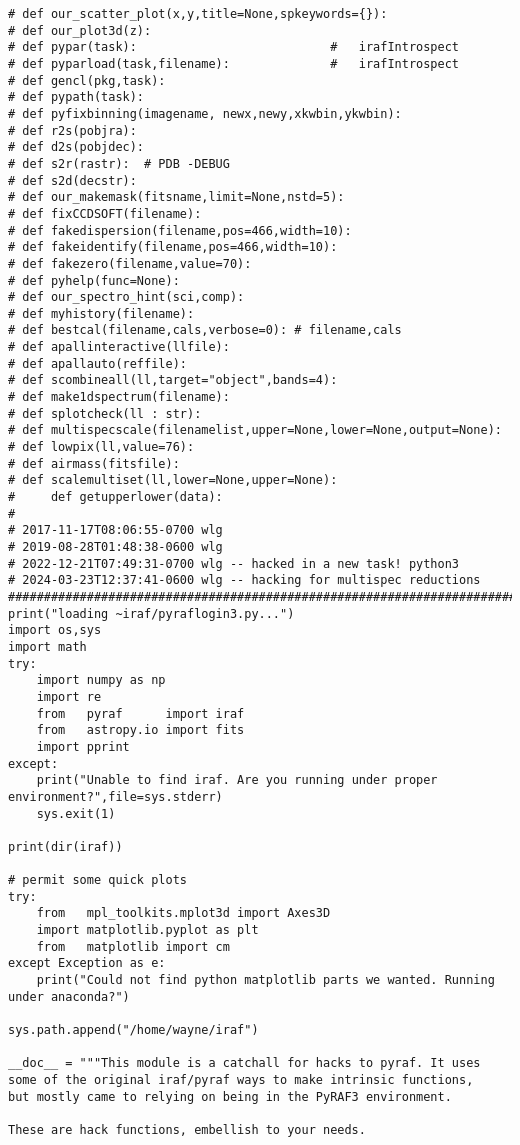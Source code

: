 {\begin{verbatim}
# def our_scatter_plot(x,y,title=None,spkeywords={}):
# def our_plot3d(z):
# def pypar(task):                           #   irafIntrospect
# def pyparload(task,filename):              #   irafIntrospect
# def gencl(pkg,task):
# def pypath(task):
# def pyfixbinning(imagename, newx,newy,xkwbin,ykwbin):
# def r2s(pobjra):
# def d2s(pobjdec):
# def s2r(rastr):  # PDB -DEBUG
# def s2d(decstr):
# def our_makemask(fitsname,limit=None,nstd=5):
# def fixCCDSOFT(filename):
# def fakedispersion(filename,pos=466,width=10):
# def fakeidentify(filename,pos=466,width=10):
# def fakezero(filename,value=70):
# def pyhelp(func=None):
# def our_spectro_hint(sci,comp):
# def myhistory(filename):
# def bestcal(filename,cals,verbose=0): # filename,cals
# def apallinteractive(llfile):
# def apallauto(reffile):
# def scombineall(ll,target="object",bands=4):
# def make1dspectrum(filename):
# def splotcheck(ll : str):
# def multispecscale(filenamelist,upper=None,lower=None,output=None):
# def lowpix(ll,value=76):
# def airmass(fitsfile):
# def scalemultiset(ll,lower=None,upper=None):
#     def getupperlower(data):
#
# 2017-11-17T08:06:55-0700 wlg
# 2019-08-28T01:48:38-0600 wlg
# 2022-12-21T07:49:31-0700 wlg -- hacked in a new task! python3
# 2024-03-23T12:37:41-0600 wlg -- hacking for multispec reductions
#############################################################################
print("loading ~iraf/pyraflogin3.py...")
import os,sys
import math
try:
    import numpy as np
    import re
    from   pyraf      import iraf
    from   astropy.io import fits
    import pprint
except:
    print("Unable to find iraf. Are you running under proper environment?",file=sys.stderr)
    sys.exit(1)

print(dir(iraf))

# permit some quick plots
try:
    from   mpl_toolkits.mplot3d import Axes3D
    import matplotlib.pyplot as plt
    from   matplotlib import cm
except Exception as e:
    print("Could not find python matplotlib parts we wanted. Running under anaconda?")

sys.path.append("/home/wayne/iraf")

__doc__ = """This module is a catchall for hacks to pyraf. It uses
some of the original iraf/pyraf ways to make intrinsic functions,
but mostly came to relying on being in the PyRAF3 environment.

These are hack functions, embellish to your needs.


\end{verbatim}}
